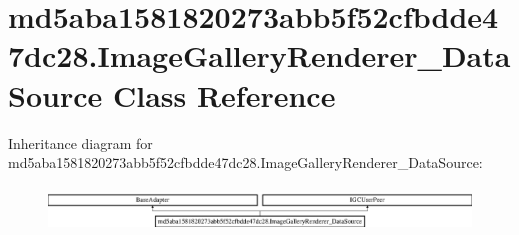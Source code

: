 \hypertarget{classmd5aba1581820273abb5f52cfbdde47dc28_1_1ImageGalleryRenderer__DataSource}{}\section{md5aba1581820273abb5f52cfbdde47dc28.\+Image\+Gallery\+Renderer\+\_\+\+Data\+Source Class Reference}
\label{classmd5aba1581820273abb5f52cfbdde47dc28_1_1ImageGalleryRenderer__DataSource}
Inheritance diagram for md5aba1581820273abb5f52cfbdde47dc28.\+Image\+Gallery\+Renderer\+\_\+\+Data\+Source\+:\begin{figure}[H]
\begin{center}
\leavevmode
\includegraphics[height=1.201717cm]{classmd5aba1581820273abb5f52cfbdde47dc28_1_1ImageGalleryRenderer__DataSource}
\end{center}
\end{figure}
